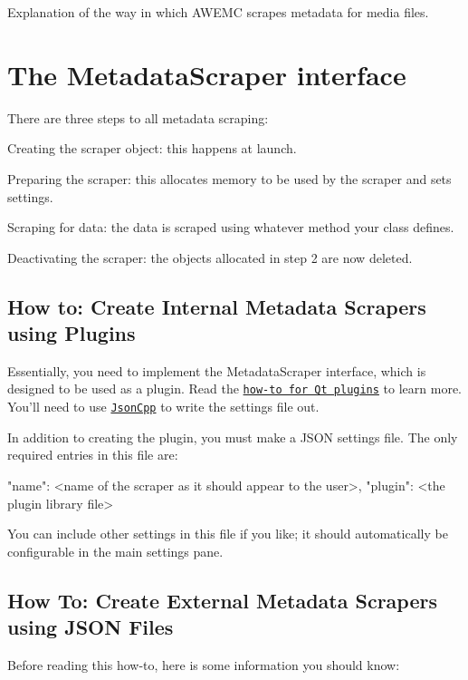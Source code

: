 Explanation of the way in which A\-W\-E\-M\-C scrapes metadata for media files.

\section*{The Metadata\-Scraper interface}

There are three steps to all metadata scraping\-:


\begin{DoxyEnumerate}
\item Creating the scraper object\-: this happens at launch.
\item Preparing the scraper\-: this allocates memory to be used by the scraper and sets settings.
\item Scraping for data\-: the data is scraped using whatever method your class defines.
\item Deactivating the scraper\-: the objects allocated in step 2 are now deleted.
\end{DoxyEnumerate}

\subsection*{How to\-: Create Internal Metadata Scrapers using Plugins}

Essentially, you need to implement the {\ttfamily Metadata\-Scraper} interface, which is designed to be used as a plugin. Read the \href{http://qt-project.org/doc/qt-4.8/plugins-howto.html}{\tt how-\/to for Qt plugins} to learn more. You'll need to use \href{http://jsoncpp.sourceforge.net/>}{\tt Json\-Cpp} to write the settings file out.

In addition to creating the plugin, you must make a J\-S\-O\-N settings file. The only required entries in this file are\-: \begin{DoxyVerb}"name": <name of the scraper as it should appear to the user>,
"plugin": <the plugin library file>
\end{DoxyVerb}


You can include other settings in this file if you like; it should automatically be configurable in the main settings pane.

\subsection*{How To\-: Create External Metadata Scrapers using J\-S\-O\-N Files}

Before reading this how-\/to, here is some information you should know\-:


